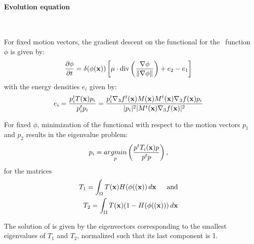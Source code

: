 \paragraph{Evolution equation}
~\par \vspace{0.3cm}
For fixed motion vectors, the gradient descent on the functional  for the \ls~function $\phi$ is given by:
\begin{equation}
  \label{eq:dphidt_cremers2005}
  \frac{\partial \phi}{\partial t} = \delta(\phi(\mathbf{x})) \left[ \mu \cdot \text{div} \left( \frac{\nabla \phi}{\| \nabla \phi \|} \right) + e_2 - e_1 \right]
\end{equation}
with the energy densities $e_i$ given by:
\begin{equation}
  \label{eq:ei_cremers2005}
  e_i = \frac{p_i^t T(\mathbf{x}) p_i}{p_i^t p_i} = \frac{p_i^t \nabla_3 f^t(\mathbf{x}) M(\mathbf{x}) M^t(\mathbf{x}) \nabla_3 f(\mathbf{x}) p_i}{|p_i|^2 |M^t(\mathbf{x}) \nabla_3 f(\mathbf{x})|^2}
\end{equation}


For fixed $\phi$, minimization of the functional  with respect to the motion vectors $p_1$ and $p_2$ results in the eigenvalue problem:
\begin{equation}
  \label{eq:dpdt_cremers2005}
  p_i = \underset{p}{argmin} \left( \frac{p^t T_i(\mathbf{x}) p}{p^t p} \right),
\end{equation}
for the matrices
\begin{eqnarray}
  \label{eq:Ti_cremers2005}
  T_1 = \int_\Omega T(\mathbf{x})H(\phi((\mathbf{x})) \, d\mathbf{x} \text{ \hspace*{0.3cm} and}\\
  T_2 = \int_\Omega T(\mathbf{x})(1-H(\phi((\mathbf{x}))) \, d\mathbf{x}
\end{eqnarray}

The solution of  is given by the eigenvectors corresponding to the smallest eigenvalues of $T_1$ and $T_2$, normalized such that its last component is 1.


\newpage
\cite{Papin2000}